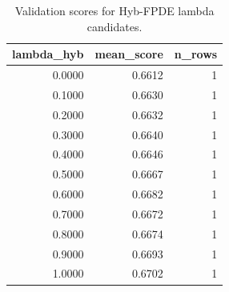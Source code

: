 \begin{table}[t]
\caption{Validation scores for Hyb-FPDE lambda candidates.}
\label{tab:lambda_distribution_computed}
\centering
\begin{tabular}{rrr}
\toprule
lambda\_hyb & mean\_score & n\_rows \\
\midrule
0.0000 & 0.6612 & 1 \\
0.1000 & 0.6630 & 1 \\
0.2000 & 0.6632 & 1 \\
0.3000 & 0.6640 & 1 \\
0.4000 & 0.6646 & 1 \\
0.5000 & 0.6667 & 1 \\
0.6000 & 0.6682 & 1 \\
0.7000 & 0.6672 & 1 \\
0.8000 & 0.6674 & 1 \\
0.9000 & 0.6693 & 1 \\
1.0000 & 0.6702 & 1 \\
\bottomrule
\end{tabular}

\end{table}
